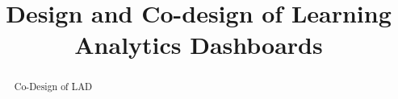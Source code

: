 \documentclass[manuscript,nonacm,12pt]{acmart}
\begin{document}
\title{Design and Co-design of Learning Analytics Dashboards}



\renewcommand{\shortauthors}{Author, et al.}

\begin{abstract}
  Co-Design of LAD
\end{abstract}



\maketitle
\end{document}
